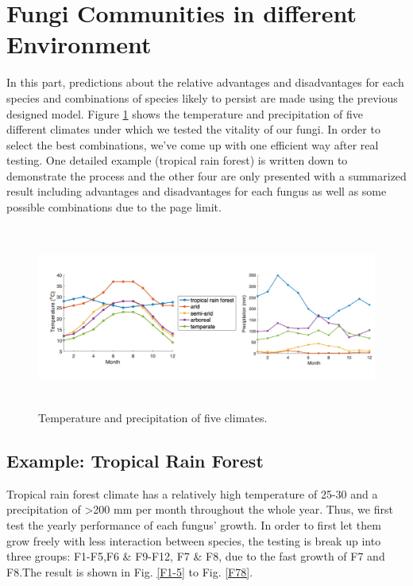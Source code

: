 \documentclass[a4paper,12pt]{article}
\begin{document}
\section{Fungi Communities in different Environment}
In this part, predictions about the relative advantages and disadvantages for each species and combinations of species likely to persist are made using the previous designed model. Figure \ref{climate} shows the temperature and precipitation of five different climates under which we tested the vitality of our fungi. In order to select the best combinations, we've come up with one efficient way after real testing. One detailed example (tropical rain forest) is written down to demonstrate the process and the other four are only presented with a summarized result including advantages and disadvantages for each fungus as well as some possible combinations due to the page limit.
\vspace{-0.6cm}
\begin{figure}[H]
	\centering
	\includegraphics[height=6cm]{./figures/five.png}
	\caption{Temperature and precipitation of five climates. \cite{climate,climate2,arboreal,ocean}}
	\vspace{-0.3cm}
	\label{climate}
\end{figure}
 

\subsection{Example: Tropical Rain Forest}
Tropical rain forest climate has a relatively high temperature of 25-30 and a precipitation of >200 mm per month throughout the whole year. Thus, we first test the yearly performance of each fungus' growth. In order to first let them grow freely with less interaction between species, the testing is break up into three groups: F1-F5,F6 \& F9-F12, F7 \& F8, due to the fast growth of F7 and F8.The result is shown in Fig. \ref{F1-5} to Fig. \ref{F78}.
\end{document}
